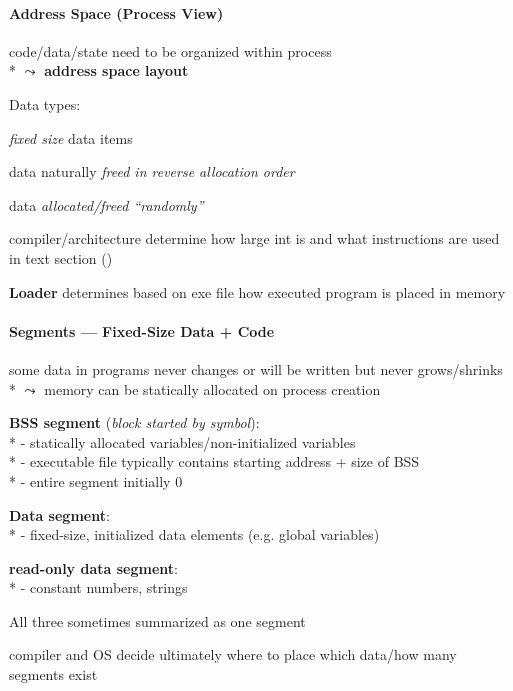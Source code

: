 \paragraph{Address Space (Process View)}
\begin{items}
	\item code/data/state need to be organized within process \\*
		\( \leadsto \) \textbf{address space layout}
	\item Data types:
	\begin{enumeration}
		\item \emph{fixed size} data items
		\item data naturally \emph{freed in reverse allocation order}
		\item data \emph{allocated/freed "`randomly"'}
	\end{enumeration}
	\item compiler/architecture determine how large int is and what instructions are used in text section ()
	\item \textbf{Loader} determines based on exe file how executed program is placed in memory
\end{items}

\paragraph{Segments --- Fixed-Size Data + Code}
\begin{items}
	\item some data in programs never changes or will be written but never grows/shrinks \\*
		\( \leadsto \) memory can be statically allocated on process creation
	\item \textbf{BSS segment} (\emph{block started by symbol}): \\*
		- statically allocated variables/non-initialized variables \\*
		- executable file typically contains starting address + size of BSS \\*
		- entire segment initially 0
	\item \textbf{Data segment}: \\*
		- fixed-size, initialized data elements (e.g. global variables)
	\item \textbf{read-only data segment}: \\*
		- constant numbers, strings
	\item All three sometimes summarized as one segment
	\item compiler and OS decide ultimately where to place which data/how many segments exist
\end{items}

